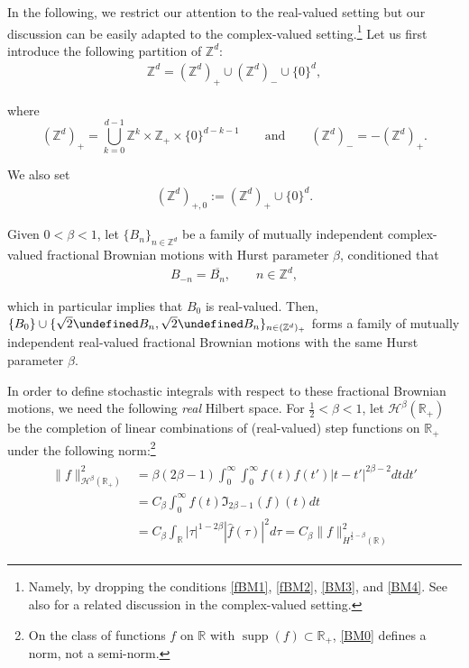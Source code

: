 \documentclass[letterpaper, 11pt,  reqno]{amsart}
\DeclareMathOperator*{\supp}{supp}
\newcommand{\1}{\hspace{0.5mm}\textup{I}\hspace{0.5mm}}
\newcommand{\noi}{\noindent}
\newcommand{\Z}{\mathbb{Z}}
\newcommand{\R}{\mathbb{R}}
\let\Re=\undefined\DeclareMathOperator*{\Re}{Re}
\let\Im=\undefined\DeclareMathOperator*{\Im}{Im}
\newcommand{\be}{\beta}
\newcommand{\ft}{\widehat}
\newcommand{\cj}{\overline}
\newcommand{\Hs}{\mathscr{H}}
\numberwithin{equation}{section}
\numberwithin{theorem}{section}
\begin{document}
In the following, we restrict our attention to the real-valued setting
but our discussion can be easily adapted to the complex-valued setting.\footnote{Namely, 
by dropping the conditions \eqref{fBM1}, \eqref{fBM2}, 
\eqref{BM3}, and \eqref{BM4}.
See also \cite{OTh1}
for a related discussion in the complex-valued setting.}
Let us first  introduce the following partition of  $\Z^d$:
\begin{align*}
\Z^d = (\Z^d)_+  \cup (\Z^d)_- \cup \{0\}^d ,
\end{align*}

\noi
where 
\begin{equation*}
(\Z^d)_+=\bigcup_{k=0}^{d-1} \Z^k\times \Z_{+}\times \{0\}^{d-k-1}
\qquad \text{and}\qquad 
(\Z^d)_- = -(\Z^d)_+.
\end{equation*}


\noi
We also  set 
\begin{align}
(\Z^d)_{+,0} := (\Z^d)_{+} \cup \{0\}^d.
\label{fBM0}
\end{align}


\noi
Given $0 < \be < 1$, 
let $\{B_n\}_{n\in \Z^d}$ be a family of 
mutually independent complex-valued fractional Brownian motions with Hurst parameter $\be$, conditioned 
that 
\begin{align}
B_{-n} = \cj{B_n}, \qquad n \in \Z^d, 
\label{fBM1}
\end{align}



\noi
which in particular implies that $B_0$ is real-valued.
Then,  $\{B_0\}\cup \{\sqrt 2\Re B_n, \sqrt 2 \Im B_n \}_{n\in (\Z^d)_{+}}$ 
forms a family of  mutually independent real-valued fractional Brownian motions
with the same Hurst parameter $\be$. 





In order to define stochastic integrals with respect to these fractional Brownian motions, 
we need the following {\it real} Hilbert space.
For $\frac 12 < \be< 1$,  let 
$\Hs^\be(\R_+)$ be the completion of 
linear combinations of
(real-valued) step functions on $\R_+$ under 
the following norm:\footnote{On the class of functions $f$ on $\R$ with 
$\supp (f) \subset \R_+$, \eqref{BM0} defines a norm, not a semi-norm.}
\begin{align}
\label{BM0}
\begin{split}
\|f\|_{\Hs^\be(\R_+)}^2
&   = \be(2\be-1)
\int_0 ^\infty \int_0^\infty f(t) f(t') |t-t'|^{2\be-2} dtdt' \\
& = C_\be \int_0^\infty f(t) \mathfrak{I}_{2\be - 1}(f) (t) dt \\
&  = C_\be  \int_\R  |\tau|^{1-2\be} |\ft{f}(\tau)|^2 d\tau 
= C_\be \|f\|_{\dot H^{\frac 12 - \be}(\R)}^2
\end{split}
\end{align}
\end{document}
